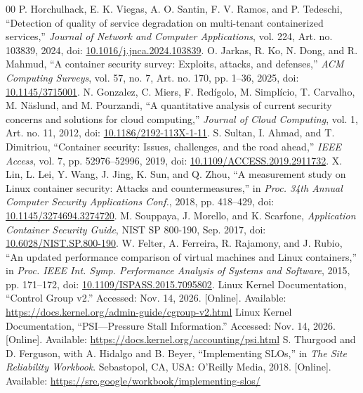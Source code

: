 \documentclass[conference,letterpaper]{IEEEtran}
\begin{document}
\begin{thebibliography}{00}
 P. Horchulhack, E. K. Viegas, A. O. Santin, F. V. Ramos, and P. Tedeschi, ``Detection of quality of service degradation on multi-tenant containerized services,'' \emph{Journal of Network and Computer Applications}, vol. 224, Art. no. 103839, 2024, doi: \href{https://doi.org/10.1016/j.jnca.2024.103839}{10.1016/j.jnca.2024.103839}.
 O. Jarkas, R. Ko, N. Dong, and R. Mahmud, ``A container security survey: Exploits, attacks, and defenses,'' \emph{ACM Computing Surveys}, vol. 57, no. 7, Art. no. 170, pp. 1--36, 2025, doi: \href{https://doi.org/10.1145/3715001}{10.1145/3715001}.
 N. Gonzalez, C. Miers, F. Red\'igolo, M. Simpl\'icio, T. Carvalho, M. N\"aslund, and M. Pourzandi, ``A quantitative analysis of current security concerns and solutions for cloud computing,'' \emph{Journal of Cloud Computing}, vol. 1, Art. no. 11, 2012, doi: \href{https://doi.org/10.1186/2192-113X-1-11}{10.1186/2192-113X-1-11}.
 S. Sultan, I. Ahmad, and T. Dimitriou, ``Container security: Issues, challenges, and the road ahead,'' \emph{IEEE Access}, vol. 7, pp. 52976--52996, 2019, doi: \href{https://doi.org/10.1109/ACCESS.2019.2911732}{10.1109/ACCESS.2019.2911732}.
 X. Lin, L. Lei, Y. Wang, J. Jing, K. Sun, and Q. Zhou, ``A measurement study on Linux container security: Attacks and countermeasures,'' in \emph{Proc. 34th Annual Computer Security Applications Conf.}, 2018, pp. 418--429, doi: \href{https://doi.org/10.1145/3274694.3274720}{10.1145/3274694.3274720}.
 M. Souppaya, J. Morello, and K. Scarfone, \emph{Application Container Security Guide}, NIST SP 800-190, Sep. 2017, doi: \href{https://doi.org/10.6028/NIST.SP.800-190}{10.6028/NIST.SP.800-190}.
 W. Felter, A. Ferreira, R. Rajamony, and J. Rubio, ``An updated performance comparison of virtual machines and Linux containers,'' in \emph{Proc. IEEE Int. Symp. Performance Analysis of Systems and Software}, 2015, pp. 171--172, doi: \href{https://doi.org/10.1109/ISPASS.2015.7095802}{10.1109/ISPASS.2015.7095802}.
 Linux Kernel Documentation, ``Control Group v2.'' Accessed: Nov. 14, 2026. [Online]. Available: \url{https://docs.kernel.org/admin-guide/cgroup-v2.html}
 Linux Kernel Documentation, ``PSI---Pressure Stall Information.'' Accessed: Nov. 14, 2026. [Online]. Available: \url{https://docs.kernel.org/accounting/psi.html}
 S. Thurgood and D. Ferguson, with A. Hidalgo and B. Beyer, ``Implementing SLOs,'' in \emph{The Site Reliability Workbook}. Sebastopol, CA, USA: O'Reilly Media, 2018. [Online]. Available: \url{https://sre.google/workbook/implementing-slos/}

\end{thebibliography}
\end{document}
